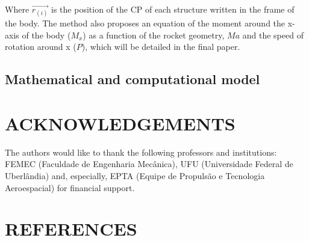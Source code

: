 \documentclass[10pt,fleqn,a4paper,twoside]{article}
\begin{document}


Where $ \vec{r_{(i)}} $ is the position of the CP of each structure written in the frame of the body. The method also proposes an equation of the moment around the x-axis of the body ($ M_{x} $) as a function of the rocket geometry, $ Ma $ and the speed of rotation around x ($ P $), which will be detailed in the final paper.


\subsection{Mathematical and computational model}


\section{ACKNOWLEDGEMENTS}

The authors would like to thank the following professors and institutions: FEMEC (Faculdade de Engenharia Mecânica), UFU (Universidade Federal de Uberlândia) and, especially, EPTA (Equipe de Propulsão e Tecnologia Aeroespacial) for financial support.




\section{REFERENCES} 


\renewcommand{\refname}{}

\end{document}
